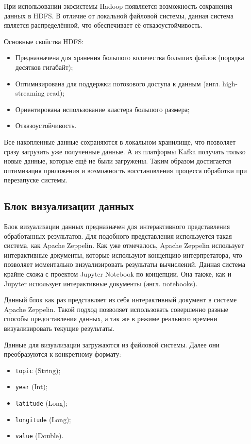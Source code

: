 При использовании экосистемы Hadoop появляется возможность сохранения данных в HDFS.
В отличие от локальной файловой системы, данная система является распределённой, что обеспечивает её отказоустойчивость.

Основные свойства HDFS:
\begin{itemize}
    \item Предназначена для хранения большого количества больших файлов (порядка десятков гигабайт);
    \item Оптимизирована для поддержки потокового доступа к данным (англ. high-streaming read);
    \item Ориентирована использование кластера большого размера;
    \item Отказоустойчивость.
\end{itemize}

Все накопленные данные сохраняются в локальном хранилище, что позволяет сразу загрузить уже полученные данные.
А из платформы Kafka получать только новые данные, которые ещё не были загружены.
Таким образом достигается оптимизация приложения и возможность восстановления процесса обработки при перезапуске системы.


\subsection{Блок визуализации данных}

Блок визуализации данных предназначен для интерактивного представления обработанных результатов.
Для подобного представления используется такая система, как Apache Zeppelin.
Как уже отмечалось, Apache Zeppelin использует интерактивные документы, которые используют концепцию интерпретатора, что позволяет моментально визуализировать результаты вычислений.
Данная система крайне схожа с проектом Jupyter Notebook по концепции.
Она также, как и Jupyter использует интерактивные документы (англ. notebooks).

Данный блок как раз представляет из себя интерактивный документ в системе Apache Zeppelin.
Такой подход позволяет использовать совершенно разные способы предоставления данных, а так же в режиме реального времени визуализировать текущие результаты.

Данные для визуализации загружаются из файловой системы.
Далее они преобразуются к конкретному формату:

\begin{itemize}
    \item \texttt{topic} (String);
    \item \texttt{year} (Int);
    \item \texttt{latitude} (Long);
    \item \texttt{longitude} (Long);
    \item \texttt{value} (Double).
\end{itemize}

